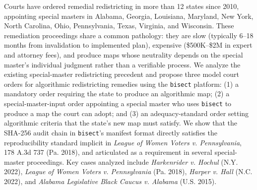 Courts have ordered remedial redistricting in more than 12 states since 2010, appointing special masters in Alabama, Georgia, Louisiana, Maryland, New York, North Carolina, Ohio, Pennsylvania, Texas, Virginia, and Wisconsin. These remediation proceedings share a common pathology: they are slow (typically 6--18 months from invalidation to implemented plan), expensive (\$500K--\$2M in expert and attorney fees), and produce maps whose neutrality depends on the special master's individual judgment rather than a verifiable process. We analyze the existing special-master redistricting precedent and propose three model court orders for algorithmic redistricting remedies using the \texttt{bisect} platform: (1) a mandatory order requiring the state to produce an algorithmic map; (2) a special-master-input order appointing a special master who uses \texttt{bisect} to produce a map the court can adopt; and (3) an adequacy-standard order setting algorithmic criteria that the state's new map must satisfy. We show that the SHA-256 audit chain in \texttt{bisect}'s manifest format directly satisfies the reproducibility standard implicit in \textit{League of Women Voters v. Pennsylvania}, 178 A.3d 737 (Pa. 2018), and articulated as a requirement in several special-master proceedings. Key cases analyzed include \textit{Harkenrider v. Hochul} (N.Y. 2022), \textit{League of Women Voters v. Pennsylvania} (Pa. 2018), \textit{Harper v. Hall} (N.C. 2022), and \textit{Alabama Legislative Black Caucus v. Alabama} (U.S. 2015).
